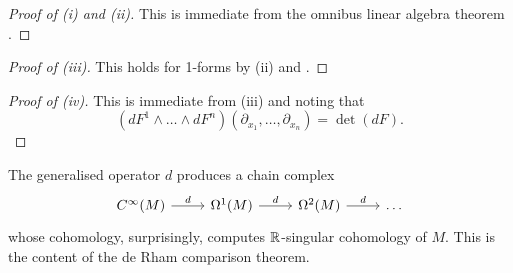 \begin{proof}[Proof of (i) and (ii)]
    This is immediate from the omnibus linear algebra theorem . 
\end{proof}
\begin{proof}[Proof of (iii)]
    This holds for 1-forms by (ii) and . 
\end{proof}
\begin{proof}[Proof of (iv)]
    This is immediate from (iii) and noting that $$(dF^{1}\wedge\dots\wedge dF^{n})(\partial_{x_{1}},\dots,\partial_{x_{n}})=\det(dF).$$ 
\end{proof}
\begin{remark}
    The generalised operator $d$ produces a chain complex 
    $$%
    \begin{tikzcd}
        {C^{\infty}(M)} & {\Omega^{1}(M)} & {\Omega^{2}(M)} & \dots
        \arrow["d", from=1-1, to=1-2]
        \arrow["d", from=1-2, to=1-3]
        \arrow["d", from=1-3, to=1-4]
    \end{tikzcd}$$
    whose cohomology, surprisingly, computes $\mathbb{R}$-singular cohomology of $M$. This is the content of the de Rham comparison theorem. 
\end{remark}